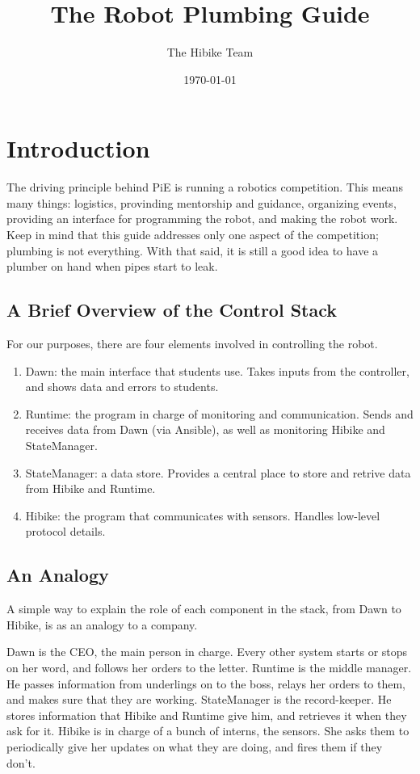 \documentclass[12pt]{book}
\title{The Robot Plumbing Guide}
\date{\today}
\author{The Hibike Team}
\begin{document}
\maketitle

\tableofcontents

\chapter{Introduction}
The driving principle behind PiE is running a robotics competition. This means many things:
logistics, provinding mentorship and guidance, organizing events,
providing an interface for programming the robot, and making
the robot work. Keep in mind that this guide addresses only one aspect
of the competition; plumbing is not everything. With that said, it is still a good
idea to have a plumber on hand when pipes start to leak.
\section{A Brief Overview of the Control Stack}
For our purposes, there are four elements involved in controlling the robot.
\begin{enumerate}
	\item Dawn: the main interface that students use. Takes inputs from the controller,
	    and shows data and errors to students.
	\item Runtime: the program in charge of monitoring and communication. Sends and receives data from
        Dawn (via Ansible), as well as monitoring Hibike and StateManager.
	\item StateManager: a data store. Provides a central place to store and retrive data from Hibike
	    and Runtime.
	\item Hibike: the program that communicates with sensors. Handles low-level protocol details.
\end{enumerate}
\section{An Analogy}
A simple way to explain the role of each component in the stack, from Dawn to Hibike, is
as an analogy to a company.

Dawn is the CEO, the main person in charge. Every other system starts or stops
on her word, and follows her orders to the letter. Runtime is the middle manager. He
passes information from underlings on to the boss, relays her orders to them, and makes
sure that they are working. StateManager is the record-keeper. He stores information
that Hibike and Runtime give him, and retrieves it when they ask for it. Hibike is
in charge of a bunch of interns, the sensors. She asks them to periodically give her
updates on what they are doing, and fires them if they don't.
\end{document}
